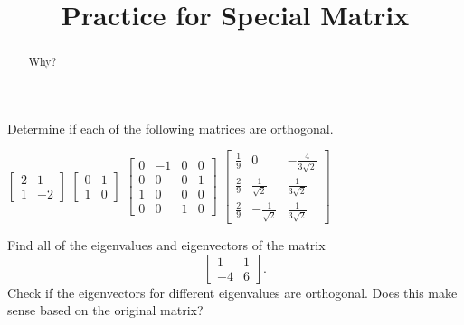 \documentclass{ximera}
\title{Practice for Special Matrix}
\begin{document}
\begin{abstract}
Why?
\end{abstract}
\maketitle




\begin{exercise}%
    Determine if each of the following matrices are orthogonal.
    \begin{tasks}
        \task $\displaystyle \begin{bmatrix}2 & 1 \\ 1 & -2 \end{bmatrix}$
        \task $\displaystyle \begin{bmatrix}0 & 1 \\ 1 & 0 \end{bmatrix}$
        \task $\displaystyle \begin{bmatrix} 0 & -1 & 0 & 0 \\ 0& 0 & 0 & 1 \\ 1 & 0 & 0 & 0 \\ 0 & 0 & 1 & 0 \end{bmatrix}$
        \task $\displaystyle \begin{bmatrix} \frac{1}{9} & 0 & -\frac{4}{3\sqrt{2}} \\ \frac{2}{9} & \frac{1}{\sqrt{2}} & \frac{1}{3\sqrt{2}} \\ \frac{2}{9} & -\frac{1}{\sqrt{2}} & \frac{1}{3\sqrt{2}}  \end{bmatrix}$
    \end{tasks}
\end{exercise}

\begin{exercise}%
    Find all of the eigenvalues and eigenvectors of the matrix
    \[ 
        \begin{bmatrix}
            1 & 1 \\ 
            -4 & 6 
        \end{bmatrix}. 
    \]
    Check if the eigenvectors for different eigenvalues are orthogonal. Does this make sense based on the original matrix?
\end{exercise}
\end{document}
